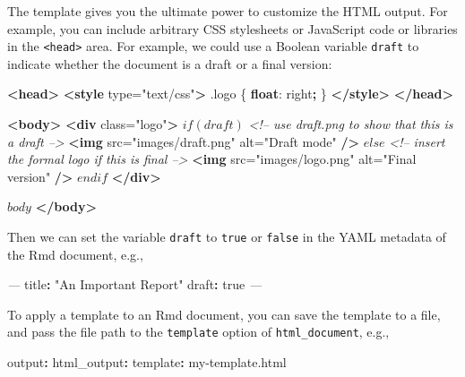 \documentclass[
  11pt,
]{krantz}
\newenvironment{Shaded}{\begin{snugshade}}{\end{snugshade}}
\newcommand{\AttributeTok}[1]{\textcolor[rgb]{0.61,0.61,0.61}{#1}}
\newcommand{\CharTok}[1]{\textcolor[rgb]{0.5,0.5,0.5}{#1}}
\newcommand{\CommentTok}[1]{\textcolor[rgb]{0.37,0.37,0.37}{\textit{#1}}}
\newcommand{\DecValTok}[1]{\textcolor[rgb]{0.06,0.06,0.06}{#1}}
\newcommand{\FunctionTok}[1]{\textcolor[rgb]{0,0,0}{#1}}
\newcommand{\KeywordTok}[1]{\textcolor[rgb]{0.27,0.27,0.27}{\textbf{#1}}}
\newcommand{\NormalTok}[1]{#1}
\newcommand{\OperatorTok}[1]{\textcolor[rgb]{0.43,0.43,0.43}{\textbf{#1}}}
\newcommand{\OtherTok}[1]{\textcolor[rgb]{0.37,0.37,0.37}{#1}}
\newcommand{\PreprocessorTok}[1]{\textcolor[rgb]{0.37,0.37,0.37}{\textit{#1}}}
\newcommand{\StringTok}[1]{\textcolor[rgb]{0.5,0.5,0.5}{#1}}
\begin{document}
The template gives you the ultimate power to customize the HTML output. For example, you can include arbitrary CSS stylesheets or JavaScript code or libraries in the \texttt{\textless{}head\textgreater{}} area. For example, we could use a Boolean variable \texttt{draft} to indicate whether the document is a draft or a final version:

\begin{Shaded}
\begin{Highlighting}[]
\KeywordTok{<head>}
\KeywordTok{<style}\OtherTok{ type=}\StringTok{"text/css"}\KeywordTok{>}
\FunctionTok{.logo}\NormalTok{ \{}
  \KeywordTok{float}\NormalTok{: }\DecValTok{right}\OperatorTok{;}
\NormalTok{\}}
\KeywordTok{</style>}
\KeywordTok{</head>}

\KeywordTok{<body>}
\KeywordTok{<div}\OtherTok{ class=}\StringTok{"logo"}\KeywordTok{>}
\NormalTok{$if(draft)$}
\CommentTok{<!-- use draft.png to show that this is a draft -->}
\KeywordTok{<img}\OtherTok{ src=}\StringTok{"images/draft.png"}\OtherTok{ alt=}\StringTok{"Draft mode"} \KeywordTok{/>}
\NormalTok{$else$}
\CommentTok{<!-- insert the formal logo if this is final -->}
\KeywordTok{<img}\OtherTok{ src=}\StringTok{"images/logo.png"}\OtherTok{ alt=}\StringTok{"Final version"} \KeywordTok{/>}
\NormalTok{$endif$}
\KeywordTok{</div>}

\NormalTok{$body$}
\KeywordTok{</body>}
\end{Highlighting}
\end{Shaded}

Then we can set the variable \texttt{draft} to \texttt{true} or \texttt{false} in the YAML metadata of the Rmd document, e.g.,

\begin{Shaded}
\begin{Highlighting}[]
\PreprocessorTok{---}
\FunctionTok{title}\KeywordTok{:}\AttributeTok{ }\StringTok{"An Important Report"}
\FunctionTok{draft}\KeywordTok{:}\AttributeTok{ }\CharTok{true}
\PreprocessorTok{---}
\end{Highlighting}
\end{Shaded}

To apply a template to an Rmd document, you can save the template to a file, and pass the file path to the \texttt{template} option of \texttt{html\_document}, e.g.,

\begin{Shaded}
\begin{Highlighting}[]
\FunctionTok{output}\KeywordTok{:}
\AttributeTok{  }\FunctionTok{html_output}\KeywordTok{:}
\AttributeTok{    }\FunctionTok{template}\KeywordTok{:}\AttributeTok{ my-template.html}
\end{Highlighting}
\end{Shaded}
\end{document}
